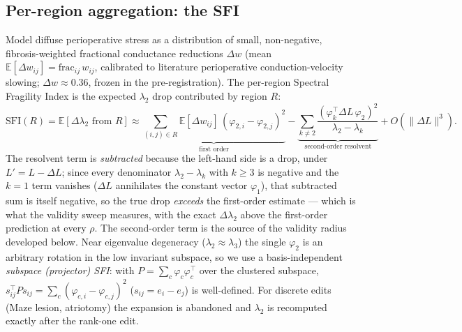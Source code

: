 \documentclass[11pt]{article}
\theoremstyle{definition}
\newcommand{\lam}{\lambda}
\newcommand{\phii}{\varphi}
\newcommand{\rhoval}{\rho}
\newcommand{\SFI}{\mathrm{SFI}}
\begin{document}
\subsection{Per-region aggregation: the SFI}
Model diffuse perioperative stress as a distribution of small, non-negative,
fibrosis-weighted fractional conductance reductions $\Delta w$ (mean
$\mathbb{E}[\Delta w_{ij}]=\mathrm{frac}_{ij}\,w_{ij}$, calibrated to literature
perioperative conduction-velocity slowing; $\Delta w\approx 0.36$, frozen in the
pre-registration). The per-region Spectral Fragility Index is the expected
$\lam_2$ drop contributed by region $R$:
\begin{equation}
\SFI(R)=\mathbb{E}[\Delta\lam_2\text{ from }R]
\approx\underbrace{\sum_{(i,j)\in R}\mathbb{E}[\Delta w_{ij}]\,(\phii_{2,i}-\phii_{2,j})^2}_{\text{first order}}
-\underbrace{\sum_{k\neq2}\frac{(\phii_k^{\!\top}\Delta
L\,\phii_2)^2}{\lam_2-\lam_k}}_{\text{second-order resolvent}}
+O(\lVert\Delta L\rVert^3).
\label{eq:sfi}
\end{equation}
The resolvent term is \emph{subtracted} because the left-hand side is a drop,
under $L'=L-\Delta L$; since every denominator $\lam_2-\lam_k$ with $k\geq3$ is
negative and the $k=1$ term vanishes ($\Delta L$ annihilates the constant vector
$\phii_1$), that subtracted sum is itself negative, so the true drop
\emph{exceeds} the first-order estimate --- which is what the validity sweep measures, with the
exact $\Delta\lam_2$ above the first-order prediction at every $\rhoval$.
The second-order term is the source of the validity radius developed below. Near
eigenvalue degeneracy ($\lam_2\approx\lam_3$) the single $\phii_2$ is an
arbitrary rotation in the low invariant subspace, so we use a basis-independent
\emph{subspace (projector) SFI}: with $P=\sum_c\phii_c\phii_c^{\!\top}$ over the
clustered subspace, $s_{ij}^{\!\top}Ps_{ij}=\sum_c(\phii_{c,i}-\phii_{c,j})^2$
($s_{ij}=e_i-e_j$) is well-defined. For discrete edits (Maze lesion,
atriotomy) the expansion is abandoned and $\lam_2$ is recomputed exactly
after the rank-one edit.
\end{document}
